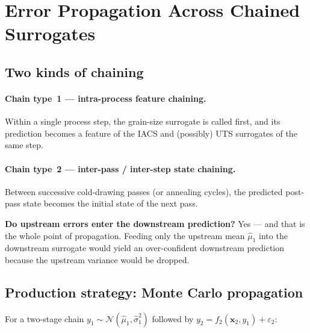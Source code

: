 \documentclass[11pt,a4paper]{article}
\begin{document}
\section{Error Propagation Across Chained Surrogates}
\label{sec:propagation}

\subsection{Two kinds of chaining}

\paragraph{Chain type~1 --- intra-process feature chaining.} Within a single process step, the grain-size surrogate is called first, and its prediction becomes a feature of the IACS and (possibly) UTS surrogates of the same step.

\paragraph{Chain type~2 --- inter-pass / inter-step state chaining.} Between successive cold-drawing passes (or annealing cycles), the predicted post-pass state becomes the initial state of the next pass.

\begin{intuitionbox}
\textbf{Do upstream errors enter the downstream prediction?} Yes --- and that is the whole point of propagation. Feeding only the upstream mean $\hat\mu_1$ into the downstream surrogate would yield an over-confident downstream prediction because the upstream variance would be dropped.
\end{intuitionbox}

\subsection{Production strategy: Monte Carlo propagation}

For a two-stage chain $y_1 \sim \mathcal{N}(\hat\mu_1, \hat\sigma_1^2)$ followed by $y_2 = f_2(\bm x_2, y_1) + \varepsilon_2$:
\end{document}
